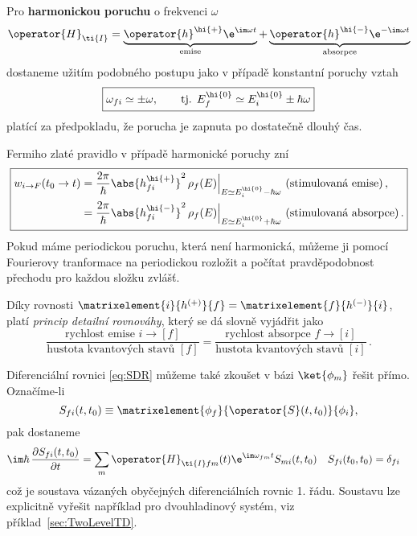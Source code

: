Pro {\bf harmonickou poruchu} o frekvenci $\omega$
\begin{equation}\label{eq:HarmonicPerturbation}
    \operator{H}_{\ti{I}}
        =\underbrace{\operator{h}^{\hi{+}}\e^{\im\omega t}}_{\text{emise}}
            +\underbrace{\operator{h}^{\hi{-}}\e^{-\im\omega t}}_{\text{absorpce}}
\end{equation}
dostaneme užitím podobného postupu jako v případě konstantní poruchy vztah
\begin{equation}\label{eq:HarmonicPerturbationE}
    \boxed{
        \omega_{fi}
            \simeq\pm\omega,
            \qquad\text{tj. }E_{f}^{\hi{0}}
            \simeq E_{i}^{\hi{0}}\pm\hbar\omega
    }
\end{equation}
platící za předpokladu, že porucha je zapnuta po dostatečně dlouhý čas.

Fermiho zlaté pravidlo v případě harmonické poruchy zní
\begin{equation}\label{eq:FermiGoldenRuleHarmonic}
    \boxed{
        \begin{aligned}
            w_{i\rightarrow F}(t_{0}\rightarrow t)
                &=\frac{2\pi}{\hbar}\abs{h_{fi}^{\hi{+}}}^{2}\,\rho_{f}(E)
                    \Big\vert_{E\simeq E_{i}^{\hi{0}}-\hbar\omega}\text{ (stimulovaná emise)}\,,\\
                &=\frac{2\pi}{\hbar}\abs{h_{fi}^{\hi{-}}}^{2}\,\rho_{f}(E)
                    \Big\vert_{E\simeq E_{i}^{\hi{0}}+\hbar\omega}\text{ (stimulovaná absorpce)}\,.
        \end{aligned}
    }
\end{equation}
Pokud máme periodickou poruchu, která není harmonická, můžeme ji pomocí Fourierovy tranformace na periodickou rozložit a počítat pravděpodobnost přechodu pro každou složku zvlášť.

Díky rovnosti $\matrixelement{i}{h^{(+)}}{f}=\matrixelement{f}{h^{(-)}}{i}$, platí 
\emph{princip detailní rovnováhy}, který se dá slovně vyjádřit jako
\begin{equation}
    \frac{{\text{rychlost emise }}i\rightarrow [f]}{{\text{hustota kvantových stavů }}[f]}
        =\frac{{\text{rychlost absorpce }}f\rightarrow [i]}
            {{\text{hustota kvantových stavů }}[i]}\,.
\end{equation}

\note
Diferenciální rovnici \eqref{eq:SDR} můžeme také zkoušet v bázi $\ket{\phi_{m}}$ řešit přímo.
Označíme-li
\begin{equation}
    S_{fi}(t,t_{0})\equiv\matrixelement{\phi_{f}}{\operator{S}(t,t_{0})}{\phi_{i}},
\end{equation}
pak dostaneme
\begin{align}
\im\hbar\,\frac{\partial S_{fi}(t,t_{0})}{\partial t}
    &=\sum_{m}\operator{H}_{\ti{I}fm}(t)\e^{\im\omega_{fm}t}S_{mi}(t,t_{0})
    & S_{fi}(t_{0},t_{0})&=\delta_{fi}
\end{align}
což je soustava vázaných obyčejných diferenciálních rovnic 1. řádu.
Soustavu lze explicitně vyřešit například pro dvouhladinový systém, viz příklad~\ref{sec:TwoLevelTD}.
